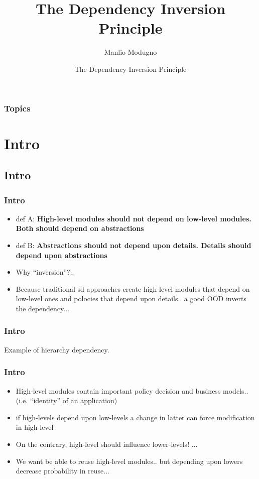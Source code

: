 \documentclass{beamer}
\title{The Dependency Inversion Principle}
\author{Manlio Modugno}
\institute[GMTechnologies]
\date[]{The Dependency Inversion Principle}
\begin{document}
\begin{frame}
  \titlepage
\end{frame}

\begin{frame}
  \frametitle{Topics}
  \tableofcontents
\end{frame}


\section{Intro}
\subsection{Intro}
\begin{frame}
  \frametitle{Intro}
  \begin{itemize}
	\item<+-> def A: \textbf{High-level modules should not depend on low-level modules. Both should depend on abstractions}
	\item<+-> def B: \textbf{Abstractions should not depend upon details. Details should depend upon abstractions}
	\item<+-> Why ``inversion''?..
	\item<+-> Because traditional sd approaches create high-level modules that depend on low-level ones and polocies that depend upon details.. a good OOD inverts the dependency...
   \end{itemize}
\end{frame}

\begin{frame}
	\frametitle{Intro}
	Example of hierarchy dependency.
	\begin{center}
	\end{center}
\end{frame}


\begin{frame}
  \frametitle{Intro}
  \begin{itemize}
	\item<+-> High-level modules contain important policy decision and business models.. (i.e. ``identity'' of an application)
	\item<+-> if high-levels depend upon low-levels a change in latter can force modification in high-level
	\item<+-> On the contrary, high-level should influence lower-levels! ...
	\item<+-> We want be able to reuse high-level modules.. but depending upon lowers decrease probability in reuse...  
   \end{itemize}
\end{frame}
\end{document}
